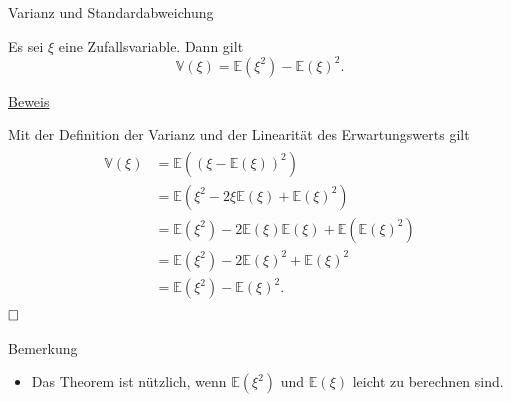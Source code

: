 \documentclass[
  8pt,
  ignorenonframetext,
]{beamer}
\providecommand{\tightlist}{%
  \setlength{\itemsep}{0pt}\setlength{\parskip}{0pt}}
\begin{document}
\begin{frame}{Varianz und Standardabweichung}
\protect\hypertarget{varianz-und-standardabweichung-2}{}
\small
\begin{theorem}[Varianzverschiebungssatz]
\normalfont
\justifying
Es sei $\xi$ eine Zufallsvariable. Dann gilt
\begin{equation}
\mathbb{V}(\xi) = \mathbb{E}\left(\xi^2 \right) - \mathbb{E}(\xi)^2.
\end{equation}
\end{theorem}

\footnotesize

\underline{Beweis}

Mit der Definition der Varianz und der Linearität des Erwartungswerts
gilt \begin{align}
\begin{split}
\mathbb{V}(\xi)
& = \mathbb{E}\left((\xi - \mathbb{E}(\xi))^2\right) \\
& = \mathbb{E}\left(\xi^2 - 2\xi\mathbb{E}(\xi) + \mathbb{E}(\xi)^2 \right) \\
& =    \mathbb{E}(\xi^2)
    - 2\mathbb{E}(\xi)\mathbb{E}(\xi)
    + \mathbb{E}\left(\mathbb{E}(\xi)^2\right)   \\
& = \mathbb{E}(\xi^2) - 2\mathbb{E}(\xi)^2 + \mathbb{E}(\xi)^2  \\
& = \mathbb{E}(\xi^2) - \mathbb{E}(\xi)^2.
\end{split}
\end{align} \(\hfill \Box\)

Bemerkung

\begin{itemize}
\tightlist
\item
  Das Theorem ist nützlich, wenn \(\mathbb{E}\left(\xi^2 \right)\) und
  \(\mathbb{E}(\xi)\) leicht zu berechnen sind.
\end{itemize}
\end{frame}
\end{document}
